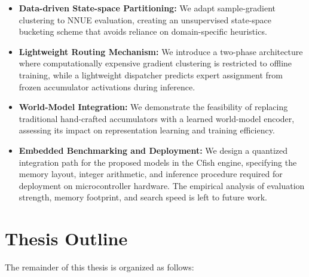 \begin{itemize}
	\item \textbf{Data-driven State-space Partitioning:} We adapt sample-gradient clustering to NNUE evaluation, creating an unsupervised state-space bucketing scheme that avoids reliance on domain-specific heuristics.
	\item \textbf{Lightweight Routing Mechanism:} We introduce a two-phase architecture where computationally expensive gradient clustering is restricted to offline training, while a lightweight dispatcher predicts expert assignment from frozen accumulator activations during inference.
	\item \textbf{World-Model Integration:} We demonstrate the feasibility of replacing traditional hand-crafted accumulators with a learned world-model encoder, assessing its impact on representation learning and training efficiency.
	\item \textbf{Embedded Benchmarking and Deployment:} We design a quantized integration path for the proposed models in the Cfish engine, specifying the memory layout, integer arithmetic, and inference procedure required for deployment on microcontroller hardware. The empirical analysis of evaluation strength, memory footprint, and search speed is left to future work.
\end{itemize}

\section{Thesis Outline}

The remainder of this thesis is organized as follows:

